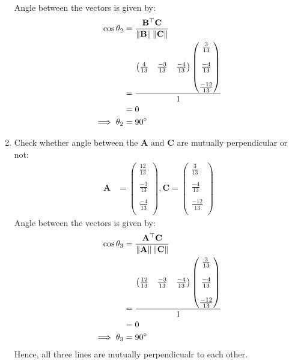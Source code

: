 \documentclass[12pt]{article}
\providecommand{\norm}[1]{\left\lVert#1\right\rVert}
\newcommand{\myvec}[1]{\ensuremath{\begin{pmatrix}#1\end{pmatrix}}}
\let\vec\mathbf
\begin{document}
\begin{enumerate}
\begin{align}
		  \end{align}
Angle between the vectors is given by:
\begin{align}
                          \cos\theta_2&=\frac{\vec{B}^\top\vec{C}}{\norm{\vec{B}}\norm{\vec{C}}}\\
        &=\frac{\myvec{\frac{4}{13}&\frac{-3}{13}&\frac{-4}{13}}\myvec{\frac{3}{13}\\\\\frac{-4}{13}\\\\\frac{-12}{13}\\}}{1}\\
                          &=0\\
		  \implies \theta_2&=90\degree
		  \end{align}
	  \item Check whether angle between the $\vec{A} \text{ and } \vec{C}$ are mutually perpendicular or not:
                   \begin{align}
    \vec{A}&=\myvec{\frac{12}{13}\\\\\frac{-3}{13}\\\\\frac{-4}{13}\\}, \vec{C}=\myvec{\frac{3}{13}\\\\\frac{-4}{13}\\\\\frac{-12}{13}\\}    
		   \end{align}
	Angle between the vectors is given by:
	\begin{align}
                          \cos\theta_3&=\frac{\vec{A}^\top\vec{C}}{\norm{\vec{A}}\norm{\vec{C}}}\\
   &=\frac{\myvec{\frac{12}{13}&\frac{-3}{13}&\frac{-4}{13}}\myvec{\frac{3}{13}\\\\\frac{-4}{13}\\\\\frac{-12}{13}\\}}{1}\\                  
			   &=0\\
		   \implies \theta_3&=90\degree  
		   \end{align}
Hence, all three lines are mutually perpendicualr to each other.
\end{enumerate}
\end{document}

